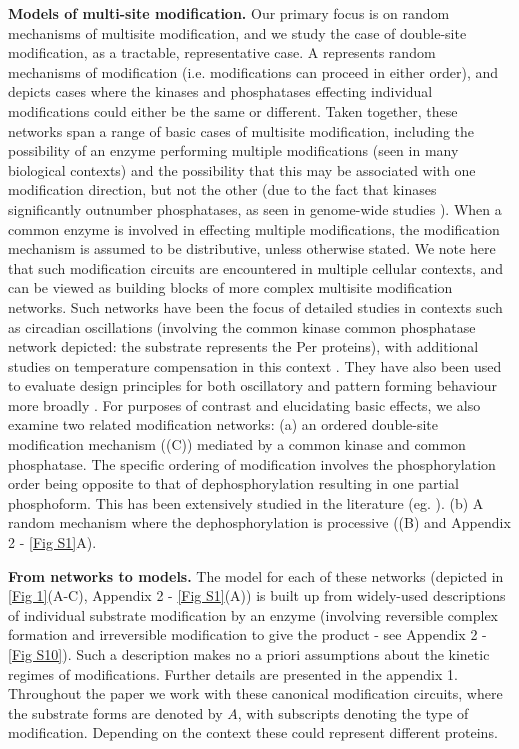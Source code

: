 \documentclass[9pt,lineno]{elife}
\begin{document}
{\bf Models of multi-site modification.} Our primary focus is on random mechanisms of multisite modification, and we study the case of double-site modification, as a tractable, representative case. A represents random mechanisms of modification (i.e. modifications can proceed in either order), and depicts cases where the kinases and phosphatases effecting individual modifications could either be the same or different. 
Taken together, these networks span a range of basic cases of multisite modification, including the possibility of an enzyme performing multiple modifications (seen in many biological contexts) and the possibility that this may be associated with one modification direction, but not the other (due to the fact that kinases significantly outnumber phosphatases, as seen in genome-wide studies \cite{Ghaemmaghami2003a}).
When a common enzyme is involved in effecting multiple modifications, the modification mechanism is assumed to be distributive, unless otherwise stated.
We note here that such modification circuits are encountered in multiple cellular contexts, and can be viewed as building blocks of more complex multisite modification networks. Such networks have been the focus of detailed studies in contexts  such as circadian oscillations \cite{Ode2018}
(involving the common kinase common phosphatase network depicted: the substrate represents the Per proteins), with additional studies on temperature compensation in this context \cite{Shinohara2017, Hatakeyama2012}. They have also been used to evaluate design principles for both oscillatory and pattern forming behaviour more broadly \cite{Jolley2012,Sugai2017}.
For purposes of contrast and elucidating basic effects, we also examine two related modification networks:
(a) an ordered double-site modification mechanism ((C)) mediated by a common kinase and common phosphatase. The specific ordering of modification involves the phosphorylation order being opposite to that of dephosphorylation resulting in one partial phosphoform. This has been extensively studied in the literature (eg. \cite{Thomson2009, Conradi2018}). (b) A random mechanism where the dephosphorylation is processive ((B) and Appendix 2 - \cref{Fig S1}A).
   
{\bf From networks to models.} The model for each of these networks (depicted in \cref{Fig 1}(A-C), Appendix 2 - \cref{Fig S1}(A)) is built up from widely-used descriptions of individual substrate modification by an enzyme (involving reversible complex formation and irreversible modification to give the product - see Appendix 2 - \cref{Fig S10}). Such a description makes no a priori assumptions about the kinetic regimes of modifications. Further details are presented in the appendix 1. Throughout the paper we work with these canonical modification circuits, where the substrate forms are denoted by $A$, with subscripts denoting the type of modification. Depending on the context these could represent different proteins.
\end{document}
